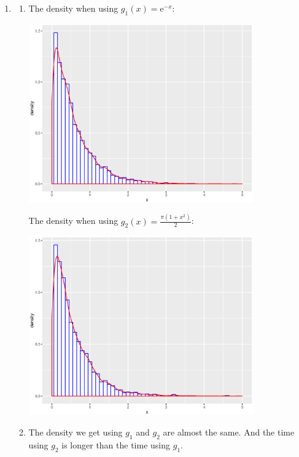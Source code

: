 \documentclass{article}
\begin{document}
\begin{enumerate}[leftmargin = 0 em, label = \arabic*., font = \bfseries]
\begin{enumerate}
	\end{enumerate}

	\item 
	\begin{enumerate}
		\item 
		

		The density when using $g_1 (x) = \mathrm{e}^{-x}$:

		\includegraphics[width = 0.8\textwidth]{p3sample1.eps}

		The density when using $g_2 (x) = \frac{\pi (1 + x^2)}{2}$:

		\includegraphics[width = 0.8\textwidth]{p3sample2.eps}

		\item

		The density we get using $g_1$ and $g_2$ are almost the same. And the time using $g_2$ is longer than the time using $g_1$. 


\end{enumerate}
\end{enumerate}
\end{document}
